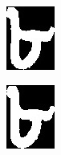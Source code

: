\begin{figure}
\begin{subfigure}{0.09\textwidth}
\end{subfigure}
\begin{subfigure}{0.09\textwidth}
    \centering
    \includegraphics[width=0.9\linewidth]{./img/experiment/stage.17/07-01-00-good}
\end{subfigure}
\begin{subfigure}{0.09\textwidth}
    \centering
    \includegraphics[width=0.9\linewidth]{./img/experiment/stage.17/08-01-00-good}

\end{subfigure}
\end{figure}
